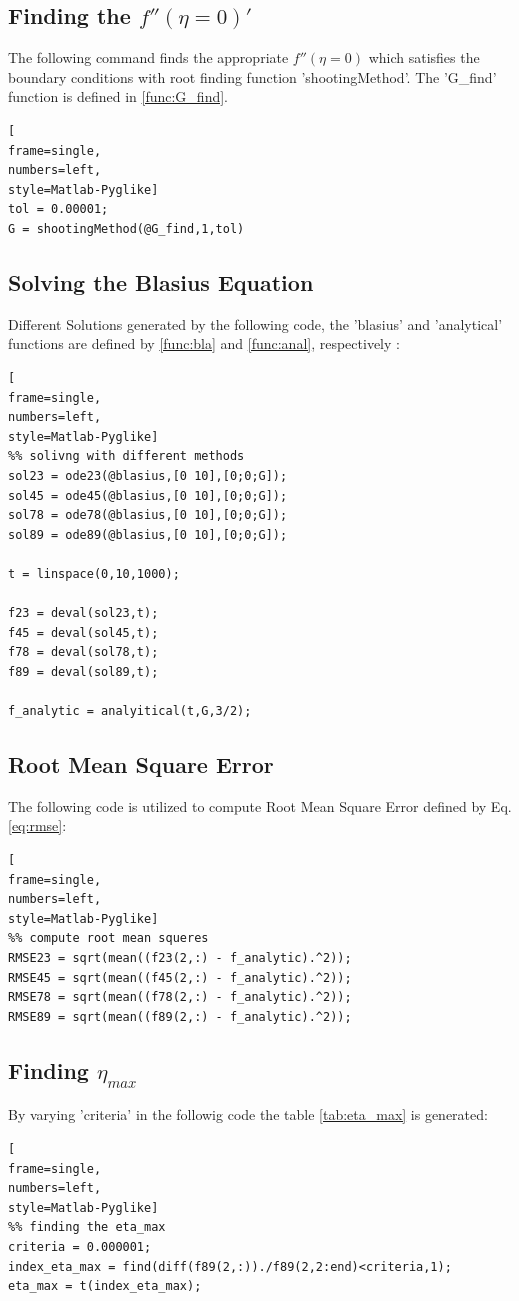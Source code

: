 \documentclass[]{report}
\begin{document}
\subsection{Finding the $f''(\eta=0)'$}
The following command finds the appropriate $f''(\eta=0)$ which satisfies the boundary conditions with root finding function 'shootingMethod'. The 'G\_find' function is defined in \ref{func:G_find}.

\begin{lstlisting}[
frame=single,
numbers=left,
style=Matlab-Pyglike]
tol = 0.00001;
G = shootingMethod(@G_find,1,tol)

\end{lstlisting}

\subsection{Solving the Blasius Equation}
Different Solutions generated by the following code, the 'blasius' and 'analytical' functions are defined by \ref{func:bla} and \ref{func:anal}, respectively :
\begin{lstlisting}[
frame=single,
numbers=left,
style=Matlab-Pyglike]
%% solivng with different methods
sol23 = ode23(@blasius,[0 10],[0;0;G]);
sol45 = ode45(@blasius,[0 10],[0;0;G]);
sol78 = ode78(@blasius,[0 10],[0;0;G]);
sol89 = ode89(@blasius,[0 10],[0;0;G]);

t = linspace(0,10,1000);

f23 = deval(sol23,t);
f45 = deval(sol45,t);
f78 = deval(sol78,t);
f89 = deval(sol89,t);

f_analytic = analyitical(t,G,3/2);
\end{lstlisting}

\subsection{Root Mean Square Error}
The following code is utilized to compute Root Mean Square Error defined by Eq.\ref{eq:rmse}:
\begin{lstlisting}[
frame=single,
numbers=left,
style=Matlab-Pyglike]
%% compute root mean squeres
RMSE23 = sqrt(mean((f23(2,:) - f_analytic).^2));
RMSE45 = sqrt(mean((f45(2,:) - f_analytic).^2));
RMSE78 = sqrt(mean((f78(2,:) - f_analytic).^2));
RMSE89 = sqrt(mean((f89(2,:) - f_analytic).^2));
\end{lstlisting}

\subsection{Finding $\eta_{max}$}
By varying 'criteria' in the followig code the table \ref{tab:eta_max} is generated:
\begin{lstlisting}[
frame=single,
numbers=left,
style=Matlab-Pyglike]
%% finding the eta_max
criteria = 0.000001;
index_eta_max = find(diff(f89(2,:))./f89(2,2:end)<criteria,1);
eta_max = t(index_eta_max);
\end{lstlisting}
\end{document}
